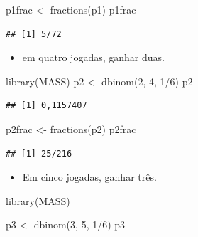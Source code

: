 \documentclass[
]{book}
\newenvironment{Shaded}{\begin{snugshade}}{\end{snugshade}}
\newcommand{\DecValTok}[1]{\textcolor[rgb]{0.00,0.00,0.81}{#1}}
\newcommand{\FunctionTok}[1]{\textcolor[rgb]{0.00,0.00,0.00}{#1}}
\newcommand{\NormalTok}[1]{#1}
\newcommand{\OtherTok}[1]{\textcolor[rgb]{0.56,0.35,0.01}{#1}}
\newcommand{\SpecialCharTok}[1]{\textcolor[rgb]{0.00,0.00,0.00}{#1}}
\providecommand{\tightlist}{%
  \setlength{\itemsep}{0pt}\setlength{\parskip}{0pt}}
\begin{document}
\begin{Shaded}
\begin{Highlighting}[]
\NormalTok{p1frac }\OtherTok{\textless{}{-}} \FunctionTok{fractions}\NormalTok{(p1)}
\NormalTok{p1frac}
\end{Highlighting}
\end{Shaded}

\begin{verbatim}
## [1] 5/72
\end{verbatim}

\begin{itemize}
\tightlist
\item
  em quatro jogadas, ganhar duas.
\end{itemize}

\begin{Shaded}
\begin{Highlighting}[]
\FunctionTok{library}\NormalTok{(MASS)}
\NormalTok{p2 }\OtherTok{\textless{}{-}} \FunctionTok{dbinom}\NormalTok{(}\DecValTok{2}\NormalTok{, }\DecValTok{4}\NormalTok{, }\DecValTok{1}\SpecialCharTok{/}\DecValTok{6}\NormalTok{)}
\NormalTok{p2}
\end{Highlighting}
\end{Shaded}

\begin{verbatim}
## [1] 0,1157407
\end{verbatim}

\begin{Shaded}
\begin{Highlighting}[]
\NormalTok{p2frac }\OtherTok{\textless{}{-}} \FunctionTok{fractions}\NormalTok{(p2)}
\NormalTok{p2frac}
\end{Highlighting}
\end{Shaded}

\begin{verbatim}
## [1] 25/216
\end{verbatim}

\begin{itemize}
\tightlist
\item
  Em cinco jogadas, ganhar três.
\end{itemize}

\begin{Shaded}
\begin{Highlighting}[]
\FunctionTok{library}\NormalTok{(MASS)}

\NormalTok{p3 }\OtherTok{\textless{}{-}} \FunctionTok{dbinom}\NormalTok{(}\DecValTok{3}\NormalTok{, }\DecValTok{5}\NormalTok{, }\DecValTok{1}\SpecialCharTok{/}\DecValTok{6}\NormalTok{)}
\NormalTok{p3}
\end{Highlighting}
\end{Shaded}
\end{document}
